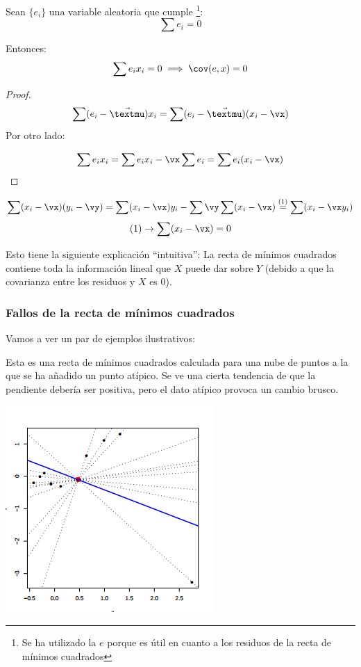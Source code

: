 \documentclass[palatino,nochap]{apuntes}
\begin{document}
\begin{prop}
Sean $\{e_i\}$ una variable aleatoria que cumple \footnote{Se ha utilizado la $e$ porque es útil en cuanto a los residuos de la recta de mínimos cuadrados}:
\[\sum e_i = 0\]

Entonces:
\[\sum e_i x_i = 0 \implies \cov(e,x) = 0\]
\end{prop}

\begin{proof}
\[\sum (e_i - \vec{µ}) x_i = \sum (e_i - \vec{µ}) (x_i - \vx) \]
Por otro lado:

\[
\sum e_ix_i = \sum e_ix_i - \vx \sum e_i = \sum e_i(x_i - \vx)
\]
\end{proof}


\begin{example}
\[
\sum (x_i - \vx)(y_i -\vy) = \sum (x_i - \vx)y_i - \sum \vy\sum(x_i - \vx) \overset{(1)}{=} \sum(x_i - \vx y_i)
\]
\[
(1) \to \sum(x_i - \vx) = 0
\]
\end{example}

Esto tiene la siguiente explicación ``intuitiva'': La recta de mínimos cuadrados contiene toda la información lineal que $X$ puede dar sobre $Y$ (debido a que la covarianza entre los residuos y $X$ es 0).


\subsubsection{Fallos de la recta de mínimos cuadrados}

Vamos a ver un par de ejemplos ilustrativos:

\begin{example}

Esta es una recta de mínimos cuadrados calculada para una nube de puntos a la que se ha añadido un punto atípico. Se ve una cierta tendencia de que la pendiente debería ser positiva, pero el dato atípico provoca un cambio brusco.
\begin{center}
\includegraphics[scale=0.9]{img/rmc_atipico2.png}
\end{center}

\end{example}
\end{document}
